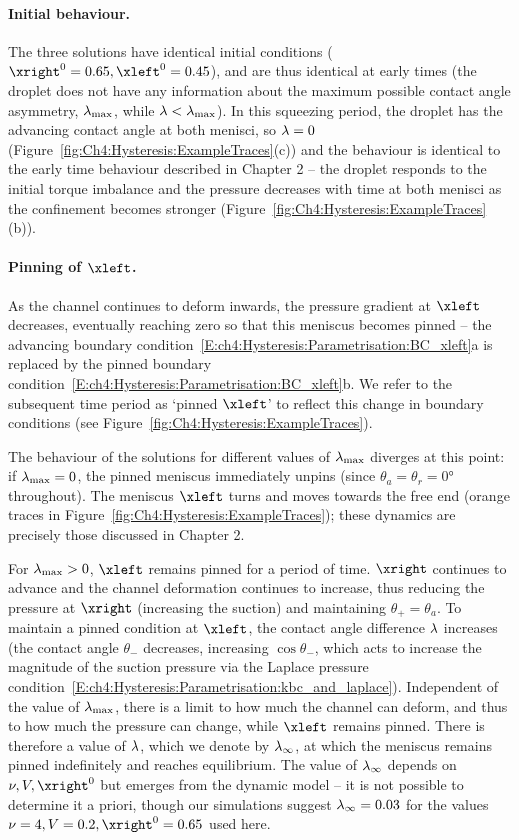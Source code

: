 \paragraph{Initial behaviour.}
The three solutions have identical initial conditions ($\xright^0 = 0.65, \xleft^0 =0.45$), and are thus identical at early times (the droplet does not have any information about the maximum possible contact angle asymmetry, $\lambda_{\text{max}}$, while $\lambda < \lambda_{\text{max}}$). In this squeezing period, the droplet has the advancing contact angle at both menisci, so $\lambda = 0$ (Figure~\ref{fig:Ch4:Hysteresis:ExampleTraces}(c)) and the behaviour is identical to the early time behaviour described in Chapter 2 -- the droplet responds to the initial torque imbalance and the pressure decreases with time at both menisci as the confinement becomes stronger (Figure~\ref{fig:Ch4:Hysteresis:ExampleTraces}(b)).

\paragraph{Pinning of $\xleft$.}
As the channel continues to deform inwards, the pressure gradient at $\xleft$ decreases, eventually reaching zero so that this meniscus becomes pinned -- the advancing boundary condition~\eqref{E:ch4:Hysteresis:Parametrisation:BC_xleft}a is replaced by the pinned boundary condition~\eqref{E:ch4:Hysteresis:Parametrisation:BC_xleft}b. We refer to the subsequent time period as `pinned $\xleft$' to reflect this change in boundary conditions (see Figure~\ref{fig:Ch4:Hysteresis:ExampleTraces}).

The behaviour of the solutions for different values of $\lambda_{\text{max}}$ diverges at this point: if $\lambda_{\text{max}} = 0$, the pinned meniscus  immediately unpins (since $\theta_a = \theta_r = 0\si{\degree}$ throughout). The meniscus $\xleft$ turns and moves towards the free end (orange traces in Figure~\ref{fig:Ch4:Hysteresis:ExampleTraces}); these dynamics are precisely those discussed in Chapter 2.

For $\lambda_{\text{max}} > 0$, $\xleft$ remains pinned for a  period of time.  $\xright$ continues to advance and the channel deformation continues to increase, thus reducing the pressure at $\xright$ (increasing the suction) and maintaining $\theta_+ = \theta_a$. To maintain a pinned condition at $\xleft$, the contact angle difference $\lambda$  increases (the contact angle $\theta_-$ decreases, increasing $\cos \theta_-$, which acts to increase the magnitude of the suction pressure via the Laplace pressure condition~\eqref{E:ch4:Hysteresis:Parametrisation:kbc_and_laplace}). Independent of the value of $\lambda_{\text{max}}$, there is a limit to how much the channel can deform, and thus to how much the pressure can change, while $\xleft$ remains pinned. There is therefore a value of $\lambda$, which we denote by $\lambda_{\infty}$, at which the meniscus remains pinned indefinitely and reaches equilibrium. The value of $\lambda_{\infty}$ depends on $\nu, V, \xright^0$ but emerges from the dynamic model -- it is not possible to determine it a priori, though our simulations suggest $\lambda_{\infty} = 0.03$ for the values $\nu = 4, V = 0.2, \xright^0 = 0.65$ used here.


